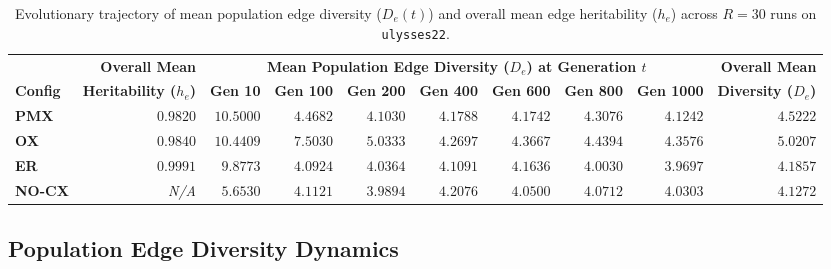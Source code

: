 \documentclass[10pt,a4paper]{article}
\begin{document}
\begin{table}[htbp]
\centering
\footnotesize
\setlength{\tabcolsep}{3.5pt}
\caption{Evolutionary trajectory of mean population edge diversity ($D_e(t)$) and overall mean edge heritability ($h_e$) across $R=30$ runs on \texttt{ulysses22}.}
\label{tab:dynamics}
\begin{tabular}{lrrrrrrrrr}
\toprule
& \textbf{Overall Mean} & \multicolumn{7}{c}{\textbf{Mean Population Edge Diversity ($D_e$) at Generation $t$}} & \textbf{Overall Mean} \\
\cmidrule(lr){3-9}
\textbf{Config} & \textbf{Heritability ($h_e$)} & \textbf{Gen 10} & \textbf{Gen 100} & \textbf{Gen 200} & \textbf{Gen 400} & \textbf{Gen 600} & \textbf{Gen 800} & \textbf{Gen 1000} & \textbf{Diversity ($D_e$)} \\
\midrule
\textbf{PMX}   & $0.9820$ & $10.5000$ & $4.4682$ & $4.1030$ & $4.1788$ & $4.1742$ & $4.3076$ & $4.1242$ & $4.5222$ \\
\textbf{OX}    & $0.9840$ & $10.4409$ & $7.5030$ & $5.0333$ & $4.2697$ & $4.3667$ & $4.4394$ & $4.3576$ & $\mathbf{5.0207}$ \\
\textbf{ER}    & $\mathbf{0.9991}$ & $9.8773$  & $4.0924$ & $4.0364$ & $4.1091$ & $4.1636$ & $4.0030$ & $3.9697$ & $4.1857$ \\
\textbf{NO-CX} & \textit{N/A}       & $5.6530$  & $4.1121$ & $3.9894$ & $4.2076$ & $4.0500$ & $4.0712$ & $4.0303$ & $4.1272$ \\
\bottomrule
\end{tabular}
\end{table}

\subsection{Population Edge Diversity Dynamics}
\end{document}
